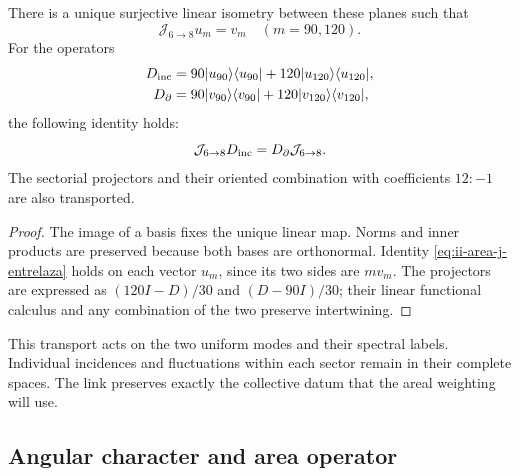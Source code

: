 \begin{theorem}
\label{thm:ii-area-entrelazamiento-colectivo}
There is a unique surjective linear isometry between these planes such that
\begin{equation}
 \mathcal J_{6\to8}u_m=v_m\quad(m=90,120).
 \label{eq:ii-area-j-colectivo}
\end{equation}
For the operators
\[
 \begin{aligned}
 D_{\rm inc}&=90|u_{90}\rangle\langle u_{90}|
             +120|u_{120}\rangle\langle u_{120}|,\\
 D_\partial&=90|v_{90}\rangle\langle v_{90}|
             +120|v_{120}\rangle\langle v_{120}|,
 \end{aligned}
\]
the following identity holds:
\begin{equation}
 \mathcal J_{6\to8}D_{\rm inc}
 =D_\partial\mathcal J_{6\to8}.
 \label{eq:ii-area-j-entrelaza}
\end{equation}
The sectorial projectors and their oriented combination with
coefficients \(12:-1\) are also transported.
\end{theorem}
\begin{proof}
The image of a basis fixes the unique linear map. Norms and
inner products are preserved because both bases are orthonormal.
Identity \eqref{eq:ii-area-j-entrelaza} holds on each vector
\(u_m\), since its two sides are \(m v_m\). The projectors are
expressed as \((120I-D)/30\) and \((D-90I)/30\); their linear functional
calculus and any combination of the two preserve intertwining.
\end{proof}

This transport acts on the two uniform modes and their spectral
labels. Individual incidences and fluctuations within
each sector remain in their complete spaces. The link preserves
exactly the collective datum that the areal weighting will use.

\subsection{Angular character and area operator}
\label{sec:ii-area-caracter}

